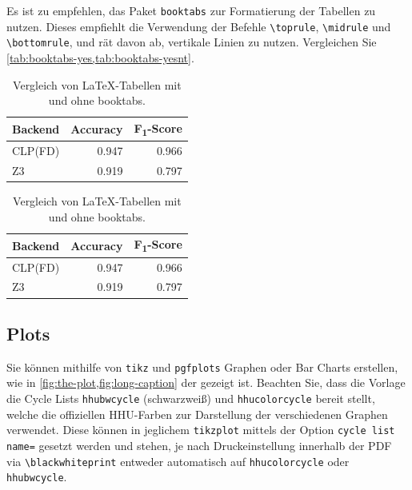 Es ist zu empfehlen, das Paket \texttt{booktabs} zur Formatierung der Tabellen
zu nutzen.
Dieses empfiehlt die Verwendung der Befehle
\texttt{\textbackslash{}toprule},
\texttt{\textbackslash{}midrule} und
\texttt{\textbackslash{}bottomrule},
und rät davon ab, vertikale Linien zu nutzen.
Vergleichen Sie \cref{tab:booktabs-yes,tab:booktabs-yesnt}.

\begin{table}
  \centering
  \caption{Vergleich von \LaTeX{}-Tabellen mit und ohne booktabs.}
  \begin{subtable}{.5\textwidth}
    \centering
    \label{tab:booktabs-yes}
    \begin{tabular}{lrr}
      \toprule
      Backend & Accuracy & F\textsubscript{1}-Score \\
      \midrule
      CLP(FD) & 0.947 & 0.966 \\
      Z3      & 0.919 & 0.797 \\
      \bottomrule
    \end{tabular}
  \end{subtable}%
  \begin{subtable}{.5\textwidth}
    \centering
    \label{tab:booktabs-yesnt}
    \begin{tabular}{|l|r|r|}
      \hline
      Backend & Accuracy & F\textsubscript{1}-Score \\ \hline
      CLP(FD) & 0.947 & 0.966 \\ \hline
      Z3      & 0.919 & 0.797 \\ \hline
    \end{tabular}
  \end{subtable}%
\end{table}



\subsection{Plots}%
\label{sec:plot}

Sie können mithilfe von \texttt{tikz} und \texttt{pgfplots}
Graphen oder Bar Charts erstellen,
wie in \cref{fig:the-plot,fig:long-caption} der gezeigt ist.
Beachten Sie, dass die Vorlage die Cycle Lists
\texttt{hhubwcycle} (schwarzweiß) und \texttt{hhucolorcycle} bereit stellt,
welche die offiziellen HHU-Farben zur Darstellung der verschiedenen Graphen
verwendet.
Diese können in jeglichem \texttt{tikzplot} mittels der Option
\texttt{cycle list name=} gesetzt werden und stehen, je nach Druckeinstellung
innerhalb der PDF via \texttt{\textbackslash{}blackwhiteprint}
entweder automatisch auf \texttt{hhucolorcycle} oder \texttt{hhubwcycle}.

